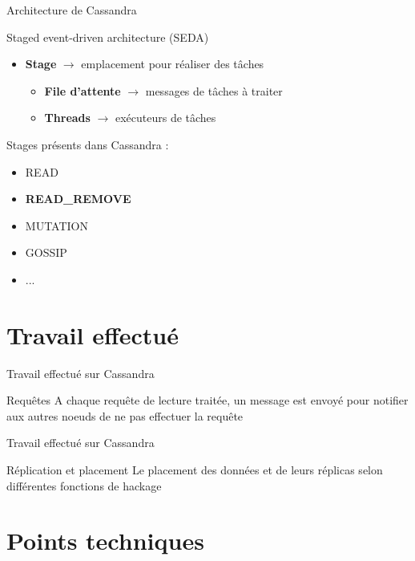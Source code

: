 \documentclass{beamer}
\begin{document}
\begin{frame}{Architecture de Cassandra}
\begin{block}{Staged event-driven architecture (SEDA)}
\begin{itemize}
    \item \textbf{Stage} $\rightarrow$ emplacement pour réaliser des tâches
    \begin{itemize}
	    \item \textbf{File d'attente} $\rightarrow$ messages de tâches à traiter
	    \item \textbf{Threads} $\rightarrow$ exécuteurs de tâches
    \end{itemize}
\end{itemize}
\end{block}
Stages présents dans Cassandra :
\begin{itemize}
	\item READ
	\item \textbf{READ\_REMOVE}
	\item MUTATION
	\item GOSSIP
	\item ...
\end{itemize}
\end{frame}

\section{Travail effectué}


\begin{frame}{Travail effectué sur Cassandra}

\begin{block}{Requêtes}
   \CheckmarkBold A chaque requête de lecture traitée, un message est envoyé pour notifier aux autres noeuds de ne pas effectuer la requête
\end{block}
\end{frame}


\begin{frame}{Travail effectué sur Cassandra}

\begin{block}{Réplication et placement}
   \CheckmarkBold Le placement des données et de leurs réplicas selon différentes fonctions de hackage
\end{block}
\end{frame}

\section{Points techniques}
\end{document}
